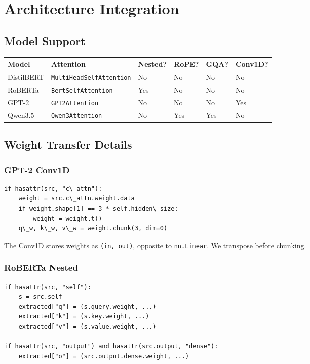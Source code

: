 \section{Architecture Integration}

\subsection{Model Support}

\begin{table}[H]
\centering
\small
\begin{tabular}{llllll}
\toprule
\textbf{Model} & \textbf{Attention} & \textbf{Nested?} & \textbf{RoPE?} & \textbf{GQA?} & \textbf{Conv1D?} \\
\midrule
DistilBERT & \texttt{MultiHeadSelfAttention} & No & No & No & No \\
RoBERTa & \texttt{BertSelfAttention} & Yes & No & No & No \\
GPT-2 & \texttt{GPT2Attention} & No & No & No & Yes \\
Qwen3.5 & \texttt{Qwen3Attention} & No & Yes & Yes & No \\
\bottomrule
\end{tabular}
\end{table}

\subsection{Weight Transfer Details}

\subsubsection{GPT-2 Conv1D}

\begin{lstlisting}
if hasattr(src, "c\_attn"):
    weight = src.c\_attn.weight.data
    if weight.shape[1] == 3 * self.hidden\_size:
        weight = weight.t()
    q\_w, k\_w, v\_w = weight.chunk(3, dim=0)
\end{lstlisting}

The Conv1D stores weights as \texttt{(in, out)}, opposite to \texttt{nn.Linear}. We 
transpose before chunking.

\subsubsection{RoBERTa Nested}

\begin{lstlisting}
if hasattr(src, "self"):
    s = src.self
    extracted["q"] = (s.query.weight, ...)
    extracted["k"] = (s.key.weight, ...)
    extracted["v"] = (s.value.weight, ...)

if hasattr(src, "output") and hasattr(src.output, "dense"):
    extracted["o"] = (src.output.dense.weight, ...)
\end{lstlisting}

